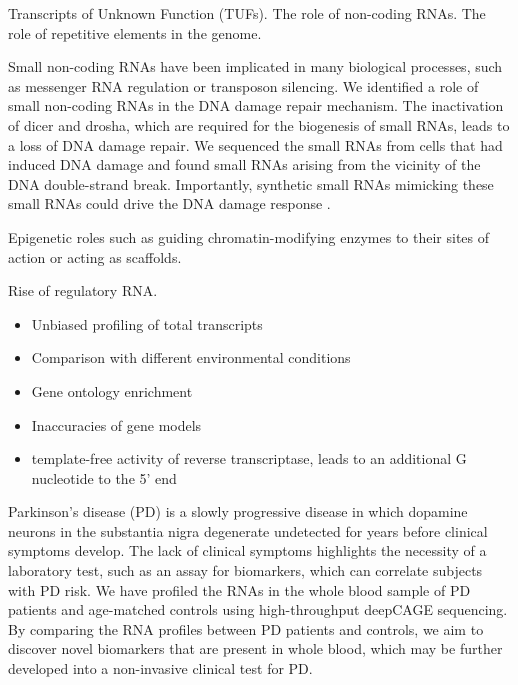 Transcripts of Unknown Function (TUFs). The role of non-coding RNAs. The role of repetitive elements in the genome.

Small non-coding RNAs have been implicated in many biological processes, such as messenger RNA regulation or transposon silencing. We identified a role of small non-coding RNAs in the DNA damage repair mechanism. The inactivation of dicer and drosha, which are required for the biogenesis of small RNAs, leads to a loss of DNA damage repair. We sequenced the small RNAs from cells that had induced DNA damage and found small RNAs arising from the vicinity of the DNA double-strand break. Importantly, synthetic small RNAs mimicking these small RNAs could drive the DNA damage response \cite{francia2012site}.

Epigenetic roles such as guiding chromatin-modifying enzymes to their sites of action or acting as scaffolds.

Rise of regulatory RNA\cite{Morris2014}.

\begin{itemize}
   \item Unbiased profiling of total transcripts
   \item Comparison with different environmental conditions
   \item Gene ontology enrichment
   \item Inaccuracies of gene models
   \item template-free activity of reverse transcriptase, leads to an additional G nucleotide to the 5' end
\end{itemize}

Parkinson’s disease (PD) is a slowly progressive disease in which dopamine neurons in the substantia nigra degenerate undetected for years before clinical symptoms develop. The lack of clinical symptoms highlights the necessity of a laboratory test, such as an assay for biomarkers, which can correlate subjects with PD risk. We have profiled the RNAs in the whole blood sample of PD patients and age-matched controls using high-throughput deepCAGE sequencing. By comparing the RNA profiles between PD patients and controls, we aim to discover novel biomarkers that are present in whole blood, which may be further developed into a non-invasive clinical test for PD.
